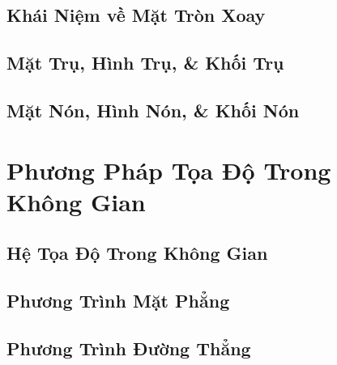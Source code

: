 \documentclass[12pt]{article}
\numberwithin{equation}{section}
\begin{document}

\subsection{Khái Niệm về Mặt Tròn Xoay}


\subsection{Mặt Trụ, Hình Trụ, \& Khối Trụ}


\subsection{Mặt Nón, Hình Nón, \& Khối Nón}


\section{Phương Pháp Tọa Độ Trong Không Gian}

\subsection{Hệ Tọa Độ Trong Không Gian}


\subsection{Phương Trình Mặt Phẳng}


\subsection{Phương Trình Đường Thẳng}


\printbibliography[heading=bibintoc]
	
\end{document}
